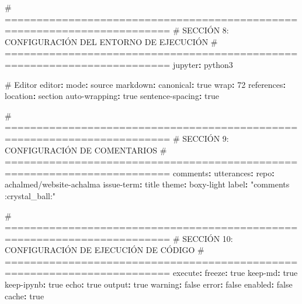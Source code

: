 \documentclass[
  doc,
  floatsintext,
  longtable,
  a4paper,
  nolmodern,
  notxfonts,
  notimes,
  12pt,
  colorlinks=true,linkcolor=blue,citecolor=blue,urlcolor=blue]{apa7}
\newenvironment{Shaded}{\begin{snugshade}}{\end{snugshade}}
\newcommand{\AttributeTok}[1]{\textcolor[rgb]{0.40,0.45,0.13}{#1}}
\newcommand{\CharTok}[1]{\textcolor[rgb]{0.13,0.47,0.30}{#1}}
\newcommand{\CommentTok}[1]{\textcolor[rgb]{0.37,0.37,0.37}{#1}}
\newcommand{\DecValTok}[1]{\textcolor[rgb]{0.68,0.00,0.00}{#1}}
\newcommand{\FunctionTok}[1]{\textcolor[rgb]{0.28,0.35,0.67}{#1}}
\newcommand{\KeywordTok}[1]{\textcolor[rgb]{0.00,0.23,0.31}{\textbf{#1}}}
\newcommand{\StringTok}[1]{\textcolor[rgb]{0.13,0.47,0.30}{#1}}
\begin{document}
\begin{Shaded}
\begin{Highlighting}[]
\CommentTok{\# ========================================================================}
\CommentTok{\# SECCIÓN 8: CONFIGURACIÓN DEL ENTORNO DE EJECUCIÓN}
\CommentTok{\# ========================================================================}
\FunctionTok{jupyter}\KeywordTok{:}\AttributeTok{ python3}

\CommentTok{\# Editor}
\FunctionTok{editor}\KeywordTok{:}
\AttributeTok{  }\FunctionTok{mode}\KeywordTok{:}\AttributeTok{ source}
\AttributeTok{  }\FunctionTok{markdown}\KeywordTok{:}
\AttributeTok{    }\FunctionTok{canonical}\KeywordTok{:}\AttributeTok{ }\CharTok{true}
\AttributeTok{    }\FunctionTok{wrap}\KeywordTok{:}\AttributeTok{ }\DecValTok{72}
\AttributeTok{    }\FunctionTok{references}\KeywordTok{:}
\AttributeTok{      }\FunctionTok{location}\KeywordTok{:}\AttributeTok{ section}
\AttributeTok{    }\FunctionTok{auto{-}wrapping}\KeywordTok{:}\AttributeTok{ }\CharTok{true}
\AttributeTok{    }\FunctionTok{sentence{-}spacing}\KeywordTok{:}\AttributeTok{ }\CharTok{true}

\CommentTok{\# ========================================================================}
\CommentTok{\# SECCIÓN 9: CONFIGURACIÓN DE COMENTARIOS}
\CommentTok{\# ========================================================================}
\FunctionTok{comments}\KeywordTok{:}
\AttributeTok{  }\FunctionTok{utterances}\KeywordTok{:}
\AttributeTok{    }\FunctionTok{repo}\KeywordTok{:}\AttributeTok{ achalmed/website{-}achalma}
\AttributeTok{    }\FunctionTok{issue{-}term}\KeywordTok{:}\AttributeTok{ title}
\AttributeTok{    }\FunctionTok{theme}\KeywordTok{:}\AttributeTok{ boxy{-}light}
\AttributeTok{    }\FunctionTok{label}\KeywordTok{:}\AttributeTok{ }\StringTok{"comments :crystal\_ball:"}

\CommentTok{\# ========================================================================}
\CommentTok{\# SECCIÓN 10: CONFIGURACIÓN DE EJECUCIÓN DE CÓDIGO}
\CommentTok{\# ========================================================================}
\FunctionTok{execute}\KeywordTok{:}
\AttributeTok{  }\FunctionTok{freeze}\KeywordTok{:}\AttributeTok{ }\CharTok{true}
\AttributeTok{  }\FunctionTok{keep{-}md}\KeywordTok{:}\AttributeTok{ }\CharTok{true}
\AttributeTok{  }\FunctionTok{keep{-}ipynb}\KeywordTok{:}\AttributeTok{ }\CharTok{true}
\AttributeTok{  }\FunctionTok{echo}\KeywordTok{:}\AttributeTok{ }\CharTok{true}
\AttributeTok{  }\FunctionTok{output}\KeywordTok{:}\AttributeTok{ }\CharTok{true}
\AttributeTok{  }\FunctionTok{warning}\KeywordTok{:}\AttributeTok{ }\CharTok{false}
\AttributeTok{  }\FunctionTok{error}\KeywordTok{:}\AttributeTok{ }\CharTok{false}
\AttributeTok{  }\FunctionTok{enabled}\KeywordTok{:}\AttributeTok{ }\CharTok{false}
\AttributeTok{  }\FunctionTok{cache}\KeywordTok{:}\AttributeTok{ }\CharTok{true}
\end{Highlighting}
\end{Shaded}
\end{document}
